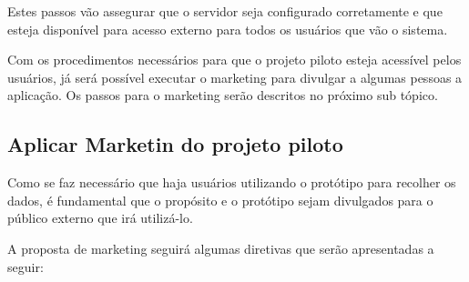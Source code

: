 Estes passos vão assegurar que o servidor seja configurado corretamente e que esteja disponível para acesso externo para
todos os usuários que vão o sistema.

Com os procedimentos necessários para que o projeto piloto esteja acessível pelos usuários, já será possível executar o marketing
para divulgar a algumas pessoas a aplicação. Os passos para o marketing serão descritos no próximo sub tópico.

\subsection{Aplicar Marketin do projeto piloto}
\label{sub:definir_tecnologia}
Como se faz necessário que haja usuários utilizando o protótipo para recolher os dados, é fundamental que o propósito
e o protótipo sejam divulgados para o público externo que irá utilizá-lo. 

A proposta de marketing seguirá algumas diretivas que serão apresentadas a seguir:

